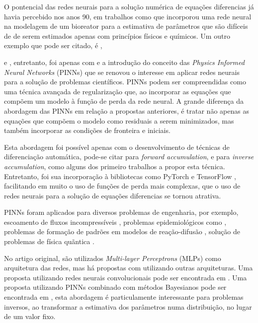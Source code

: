 O pontencial das redes neurais para a solução numérica de equações diferencias 
já havia percebido nos anos 90, em trabalhos como \cite{psichogios-etal:92} que
incorporou uma rede neural na modelagem de um bioreator para a estimativa de
parâmetros que são difíceis de de serem estimados apenas com princípios físicos 
e químicos. Um outro exemplo que pode ser citado, é \cite{lagaris-etal:98},


\cite{meade-fernandez:94} e , entretanto, 
foi apenas com \cite{raissi-etal:19} e a introdução do conceito das 
\textit{Physics Informed Neural Networks} 
(PINNs) que se renovou o interesse em aplicar redes neurais para a solução de 
problemas científicos.
PINNs podem ser compreendidas como uma técnica avançada de regularização que, ao 
incorporar as equações que compõem um modelo à função de perda da rede neural. A
grande diferença da abordagem das PINNs em relação a propostas anteriores, é tratar
não apenas as equações que compõem o modelo como residuais a serem minimizados, mas 
também incorporar as condições de fronteira e iniciais. 

Esta abordagem foi possível apenas com o desenvolvimento de técnicas de 
diferenciação automática, pode-se citar \cite{wengert:64-diferenciao-automatica} 
para \textit{forward accumulation}, e \cite{linnainmaa:76-diferenciao-automatica} 
para \textit{inverse accumulation}, como alguns dos primeiro trabalhos a propor 
esta técnica. Entretanto, foi sua incorporação à bibliotecas como 
PyTorch \cite{pytorch:19} e TensorFlow \cite{tensorflow:16}, facilitando em muito
o uso de funções de perda mais complexas, que o uso de redes neurais para a solução
de equações diferencias se tornou atrativa. 

PINNs foram aplicados para diversos problemas de engenharia, por exemplo,
escoamento de fluxos incompressíveis \cite{jin-et-al:21-navier-stokes}, 
problemas epidemiológicos como \cite{shaier-etal:22-dinns}, problemas de formação
de padrões em modelos de reação-difusão \cite{giampaolo-etal:22-gray-scott},
solução de problemas de física quãntica \cite{jin-etal:2022-schrondiger}.

No artigo original, são utilizados \textit{Multi-layer Perceptrons} (MLPs)
como arquitetura das redes, mas há propostas com utilizando outras arquiteturas.
Uma proposta utilizando redes neurais convolucionais pode ser encontrada em 
\cite{shi-etal:24-convnet}. Uma proposta utilizando PINNs combinado com 
métodos Bayesianos pode ser encontrada em \cite{yang:21-bpinns}, esta 
abordagem é particulamente interessante para problemas inversos, ao transformar
a estimativa dos parâmetros numa distribuição, no lugar de um valor fixo.

